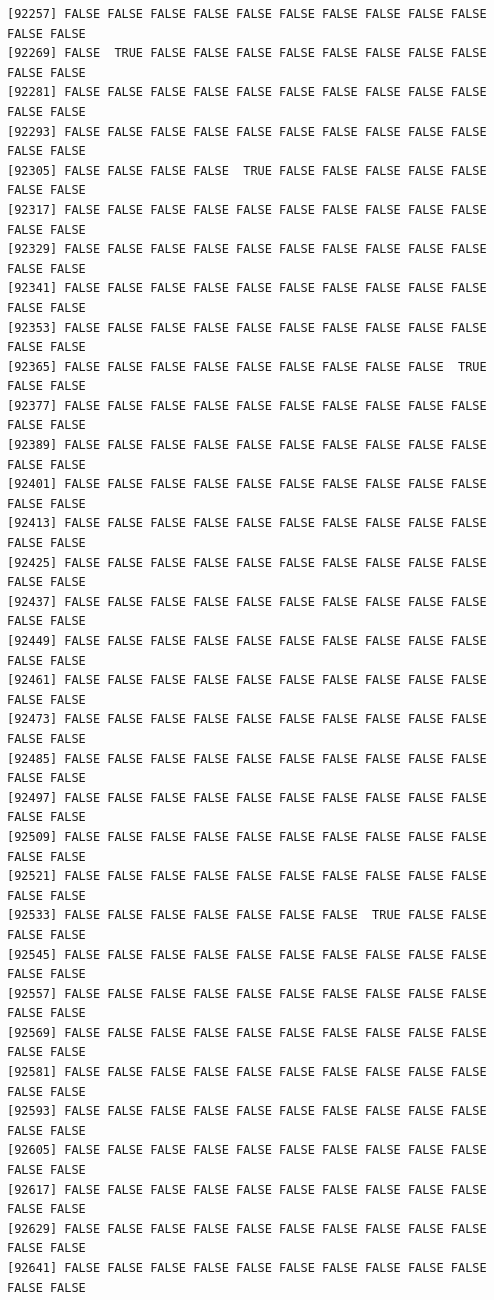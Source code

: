 \documentclass[
  a4paper,
  DIV=11,
  numbers=noendperiod]{scrartcl}
\begin{document}
\begin{verbatim}
[92257] FALSE FALSE FALSE FALSE FALSE FALSE FALSE FALSE FALSE FALSE FALSE FALSE
[92269] FALSE  TRUE FALSE FALSE FALSE FALSE FALSE FALSE FALSE FALSE FALSE FALSE
[92281] FALSE FALSE FALSE FALSE FALSE FALSE FALSE FALSE FALSE FALSE FALSE FALSE
[92293] FALSE FALSE FALSE FALSE FALSE FALSE FALSE FALSE FALSE FALSE FALSE FALSE
[92305] FALSE FALSE FALSE FALSE  TRUE FALSE FALSE FALSE FALSE FALSE FALSE FALSE
[92317] FALSE FALSE FALSE FALSE FALSE FALSE FALSE FALSE FALSE FALSE FALSE FALSE
[92329] FALSE FALSE FALSE FALSE FALSE FALSE FALSE FALSE FALSE FALSE FALSE FALSE
[92341] FALSE FALSE FALSE FALSE FALSE FALSE FALSE FALSE FALSE FALSE FALSE FALSE
[92353] FALSE FALSE FALSE FALSE FALSE FALSE FALSE FALSE FALSE FALSE FALSE FALSE
[92365] FALSE FALSE FALSE FALSE FALSE FALSE FALSE FALSE FALSE  TRUE FALSE FALSE
[92377] FALSE FALSE FALSE FALSE FALSE FALSE FALSE FALSE FALSE FALSE FALSE FALSE
[92389] FALSE FALSE FALSE FALSE FALSE FALSE FALSE FALSE FALSE FALSE FALSE FALSE
[92401] FALSE FALSE FALSE FALSE FALSE FALSE FALSE FALSE FALSE FALSE FALSE FALSE
[92413] FALSE FALSE FALSE FALSE FALSE FALSE FALSE FALSE FALSE FALSE FALSE FALSE
[92425] FALSE FALSE FALSE FALSE FALSE FALSE FALSE FALSE FALSE FALSE FALSE FALSE
[92437] FALSE FALSE FALSE FALSE FALSE FALSE FALSE FALSE FALSE FALSE FALSE FALSE
[92449] FALSE FALSE FALSE FALSE FALSE FALSE FALSE FALSE FALSE FALSE FALSE FALSE
[92461] FALSE FALSE FALSE FALSE FALSE FALSE FALSE FALSE FALSE FALSE FALSE FALSE
[92473] FALSE FALSE FALSE FALSE FALSE FALSE FALSE FALSE FALSE FALSE FALSE FALSE
[92485] FALSE FALSE FALSE FALSE FALSE FALSE FALSE FALSE FALSE FALSE FALSE FALSE
[92497] FALSE FALSE FALSE FALSE FALSE FALSE FALSE FALSE FALSE FALSE FALSE FALSE
[92509] FALSE FALSE FALSE FALSE FALSE FALSE FALSE FALSE FALSE FALSE FALSE FALSE
[92521] FALSE FALSE FALSE FALSE FALSE FALSE FALSE FALSE FALSE FALSE FALSE FALSE
[92533] FALSE FALSE FALSE FALSE FALSE FALSE FALSE  TRUE FALSE FALSE FALSE FALSE
[92545] FALSE FALSE FALSE FALSE FALSE FALSE FALSE FALSE FALSE FALSE FALSE FALSE
[92557] FALSE FALSE FALSE FALSE FALSE FALSE FALSE FALSE FALSE FALSE FALSE FALSE
[92569] FALSE FALSE FALSE FALSE FALSE FALSE FALSE FALSE FALSE FALSE FALSE FALSE
[92581] FALSE FALSE FALSE FALSE FALSE FALSE FALSE FALSE FALSE FALSE FALSE FALSE
[92593] FALSE FALSE FALSE FALSE FALSE FALSE FALSE FALSE FALSE FALSE FALSE FALSE
[92605] FALSE FALSE FALSE FALSE FALSE FALSE FALSE FALSE FALSE FALSE FALSE FALSE
[92617] FALSE FALSE FALSE FALSE FALSE FALSE FALSE FALSE FALSE FALSE FALSE FALSE
[92629] FALSE FALSE FALSE FALSE FALSE FALSE FALSE FALSE FALSE FALSE FALSE FALSE
[92641] FALSE FALSE FALSE FALSE FALSE FALSE FALSE FALSE FALSE FALSE FALSE FALSE

\end{verbatim}
\end{document}
